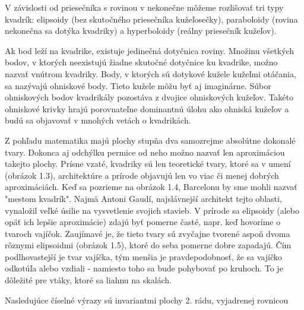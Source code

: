 V závislosti od priesečníka s rovinou v nekonečne môžeme rozlišovať
tri typy kvadrík: elipsoidy (bez skutočného priesečníka kužeľosečky),
paraboloidy (rovina nekonečna sa dotýka kvadriky) a hyperboloidy
(reálny priesečník kužeľov). 

Ak bod leží na kvadrike, existuje jedinečná dotyčnica roviny. Množinu všetkých bodov, v ktorých neexistujú žiadne skutočné dotyčnice ku kvadrike, možno nazvať vnútrom kvadriky. Body, v ktorých sú dotykové kužele kužeľmi otáčania, sa nazývajú ohniskové body. Tieto kužele môžu byť aj imaginárne. Súbor ohniskových bodov kvadrikály pozostáva z dvojice ohniskových kužeľov. Takéto ohniskové krivky hrajú porovnateľne dominantnú úlohu ako ohniská kužeľov a budú sa objavovať v mnohých vetách o kvadrikách.

Z pohľadu matematika majú plochy stupňa dva samozrejme absolútne dokonalé tvary. Dokonca aj odchýlku permice od neho možno nazvať len aproximáciou takejto plochy. Prísne vzaté, kvadriky sú len teoretické tvary, ktoré sa v umení (obrázok 1.3), architektúre a prírode objavujú len vo viac či menej dobrých aproximáciách. Keď sa pozrieme na obrázok 1.4, Barcelonu by sme mohli nazvať "mestom kvadrík". Najmä Antoni Gaudí, najslávnejší architekt tejto oblasti, vynaložil veľké úsilie na vysvetlenie svojich stavieb. V prírode sa elipsoidy (alebo opäť ich lepšie aproximácie) zdajú byť pomerne časté, napr. keď hovoríme o tvaroch vajíčok. Zaujímavé je, že tieto tvary sú zvyčajne tvorené aspoň dvoma rôznymi elipsoidmi (obrázok 1.5), ktoré do seba pomerne dobre zapadajú. Čím podlhovastejší je tvar vajíčka, tým menšia je pravdepodobnosť, že sa vajíčko odkotúľa alebo vzdiali - namiesto toho sa bude pohybovať po kruhoch. To je dôležité pre vtáky, ktoré sa liahnu na skalách.

Nasledujúce číselné výrazy sú invariantmi plochy 2. rádu, vyjadrenej rovnicou

